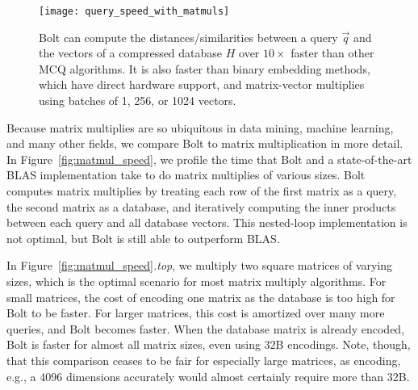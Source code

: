

\begin{figure}[h]
\begin{center}
\texttt{[image: query\_speed\_with\_matmuls]}
\caption{Bolt can compute the distances/similarities between a query $\vec{q}$ and the vectors of a compressed database $H$ over $10\times$ faster than other MCQ algorithms. It is also faster than binary embedding methods, which have direct hardware support, and matrix-vector multiplies using batches of 1, 256, or 1024 vectors.}
\label{fig:query_speeds}
\end{center}
\end{figure}

Because matrix multiplies are so ubiquitous in data mining, machine learning, and many other fields, we compare Bolt to matrix multiplication in more detail. In Figure~\ref{fig:matmul_speed}, we profile the time that Bolt and a state-of-the-art BLAS implementation \cite{eigen} take to do matrix multiplies of various sizes. Bolt computes matrix multiplies by treating each row of the first matrix as a query, the second matrix as a database, and iteratively computing the inner products between each query and all database vectors. This nested-loop implementation is not optimal, but Bolt is still able to outperform BLAS.

In Figure~\ref{fig:matmul_speed}\textit{.top}, we multiply two square matrices of varying sizes, which is the optimal scenario for most matrix multiply algorithms. For small matrices, the cost of encoding one matrix as the database is too high for Bolt to be faster. For larger matrices, this cost is amortized over many more queries, and Bolt becomes faster. When the database matrix is already encoded, Bolt is faster for almost all matrix sizes, even using 32B encodings. Note, though, that this comparison ceases to be fair for especially large matrices, as encoding, e.g., a $4096$ dimensions accurately would almost certainly require more than 32B. %

